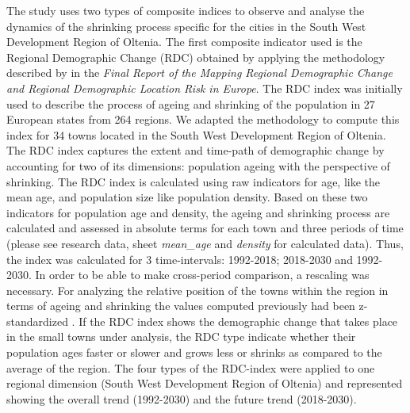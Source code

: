 The study uses two types of composite indices to observe and analyse the dynamics of the shrinking process specific for the cities in the South West Development Region of Oltenia. The first composite indicator used is the Regional Demographic Change (RDC) obtained by applying the methodology described by \citet{tivig_mapping_2008} in the \textit{Final Report of the Mapping Regional Demographic Change and Regional Demographic Location Risk in Europe}. The RDC index was initially used to describe the process of ageing and shrinking of the population in 27 European states from 264 regions. We adapted the methodology to compute this index for 34 towns located in the South West Development Region of Oltenia. The RDC index captures the extent and time-path of demographic change by accounting for two of its dimensions: population ageing with the perspective of shrinking. The RDC index is calculated using raw indicators for age, like the mean age, and population size like population density. Based on these two indicators for population age and density, the ageing and shrinking process are calculated and assessed in absolute terms for each town and three periods of time (please see research data, sheet \textit{mean\_age} and \textit{density} for calculated data). Thus, the index was calculated for 3 time-intervals: 1992-2018; 2018-2030 and 1992-2030. In order to be able to make cross-period comparison, a rescaling was necessary. For analyzing the relative position of the towns within the region in terms of ageing and shrinking the values computed previously had been z-standardized \citep{tivig_mapping_2008}. If the RDC index shows the demographic change that takes place in the small towns under analysis, the RDC type indicate whether their population ages faster or slower and grows less or shrinks as compared to the average of the region. The four types of the RDC-index were applied to one regional dimension (South West Development Region of Oltenia) and represented showing the overall trend (1992-2030) and the future trend (2018-2030).

